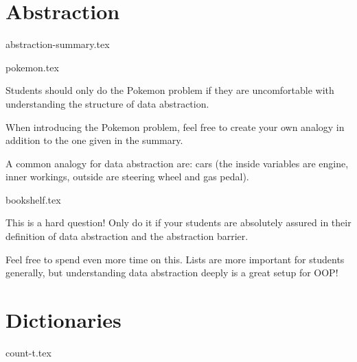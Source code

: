 \documentclass{exam}
\begin{document}
\section{Abstraction}
{abstraction-summary.tex}
\begin{questions}
    {pokemon.tex}
    \begin{questionmeta}
        Students should only do the Pokemon problem if they are uncomfortable with understanding the structure of data abstraction.
    \end{questionmeta}
    \begin{questionmeta}
        When introducing the Pokemon problem, feel free to create your own analogy in addition to the one given in the summary.
    \end{questionmeta}
    \begin{questionmeta}
        A common analogy for data abstraction are: cars (the inside variables are engine, inner workings, outside are steering wheel and gas pedal).
    \end{questionmeta}
    {bookshelf.tex}
    \begin{questionmeta}
        This is a hard question! Only do it if your students are absolutely assured in their definition of data abstraction and the abstraction barrier.
    \end{questionmeta}
    \begin{questionmeta}
        Feel free to spend even more time on this. Lists are more important for students generally, but understanding data abstraction deeply is a great setup for OOP!
    \end{questionmeta}
\end{questions}

\newpage
\section{Dictionaries}
\begin{questions}
    {count-t.tex}
\end{questions}
\end{document}
